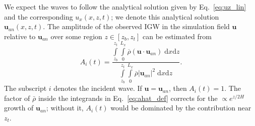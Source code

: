 \documentclass[
        fleqn,
        usenatbib,
    ]{mnras}
\newcommand*{\abs}[1]{\left|#1\right|}
\newcommand*{\p}[1]{\left(#1\right)}
\newcommand*{\bm}[1]{\mathbf{#1}}
\begin{document}
We expect the waves to follow the analytical solution given by
Eq.~\eqref{eq:uz_lin} and the corresponding $u_x(x, z, t)$; we denote this
analytical solution $\bm{u}_{an}(x, z, t)$. The amplitude of the observed IGW in the
simulation field $\bm{u}$ relative to $\bm{u}_{an}$ over
some region $z \in [z_b, z_t]$ can be estimated from
\begin{equation}
    A_i(t) = \frac{\int\limits_{z_b}^{z_t}\int\limits_0^{L_x}
        \overline{\rho}\p{\bm{u} \cdot \bm{u}_{an}}\;\mathrm{d}x\mathrm{d}z}
        {\int\limits_{z_b}^{z_t}\int\limits_0^{L_x}
        \overline{\rho}\abs{\bm{u}_{an}}^2\;\mathrm{d}x\mathrm{d}z}.
        \label{eq:ahat_def}
\end{equation}
The subscript $i$ denotes the incident wave. If $\bm{u} = \bm{u}_{an}$, then
$A_i(t) = 1$. \textcolor{Corr}{The factor of $\bar{\rho}$ inside the integrands
in Eq.~\eqref{eq:ahat_def} corrects for the $\propto e^{z/2H}$ growth of
$\bm{u}_{an}$; without it, $A_i(t)$ would be dominated by the contribution near
$z_t$.}
\end{document}
